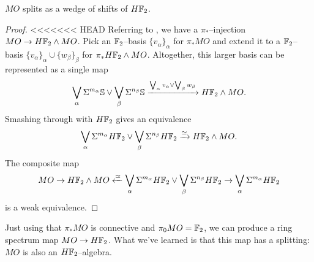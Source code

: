 \begin{lemma}
$MO$ splits as a wedge of shifts of $H\mathbb F_2$.
\end{lemma}
\begin{proof}
<<<<<<< HEAD
Referring to , we have a $\pi_*$--injection $MO \to H\mathbb F_2 \wedge MO$.  Pick an $\mathbb F_2$--basis $\{v_\alpha\}_\alpha$ for $\pi_* MO$ and extend it to a $\mathbb F_2$--basis $\{v_\alpha\}_\alpha \cup \{w_\beta\}_\beta$ for $\pi_* H\mathbb F_2 \wedge MO$.  Altogether, this larger basis can be represented as a single map \[\bigvee_\alpha \Sigma^{m_\alpha} \mathbb S \vee \bigvee_\beta \Sigma^{n_\beta} \mathbb S \xrightarrow{\bigvee_\alpha v_\alpha \vee \bigvee_\beta w_\beta} H\mathbb F_2 \wedge MO.\]  Smashing through with $H\mathbb F_2$ gives an equivalence \[\bigvee_\alpha \Sigma^{m_\alpha} H\mathbb F_2 \vee \bigvee_\beta \Sigma^{n_\beta} H\mathbb F_2 \xrightarrow\simeq H\mathbb F_2 \wedge MO.\]  The composite map \[MO \to H\mathbb F_2 \wedge MO \xleftarrow\simeq \bigvee_\alpha \Sigma^{m_\alpha} H\mathbb F_2 \vee \bigvee_\beta \Sigma^{n_\beta} H\mathbb F_2 \to \bigvee_\alpha \Sigma^{m_\alpha} H\mathbb F_2\] is a weak equivalence.
\end{proof}

\begin{remark}
Just using that $\pi_* MO$ is connective and $\pi_0 MO = \mathbb F_2$, we can produce a ring spectrum map $MO \to H\mathbb F_2$.  What we've learned is that this map has a splitting: $MO$ is also an $H\mathbb F_2$--algebra.
\end{remark}



